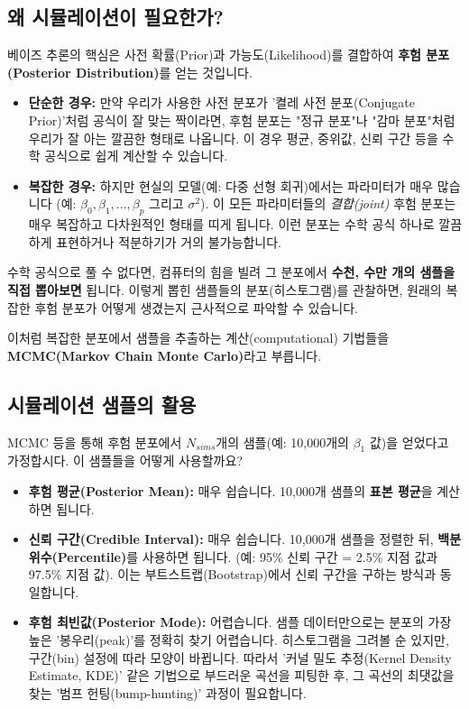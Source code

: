 \documentclass[11pt,a4paper]{book}
\theoremstyle{definition}
\begin{document}
\subsection{왜 시뮬레이션이 필요한가?}

베이즈 추론의 핵심은 사전 확률(Prior)과 가능도(Likelihood)를 결합하여 \textbf{후험 분포(Posterior Distribution)}를 얻는 것입니다.

\begin{itemize}
    \item \textbf{단순한 경우:} 만약 우리가 사용한 사전 분포가 '켤레 사전 분포(Conjugate Prior)'처럼 공식이 잘 맞는 짝이라면, 후험 분포는 "정규 분포"나 "감마 분포"처럼 우리가 잘 아는 깔끔한 형태로 나옵니다. 이 경우 평균, 중위값, 신뢰 구간 등을 수학 공식으로 쉽게 계산할 수 있습니다.
    \item \textbf{복잡한 경우:} 하지만 현실의 모델(예: 다중 선형 회귀)에서는 파라미터가 매우 많습니다 (예: $\beta_0, \beta_1, ..., \beta_p$ 그리고 $\sigma^2$). 이 모든 파라미터들의 \textit{결합(joint)} 후험 분포는 매우 복잡하고 다차원적인 형태를 띠게 됩니다. 이런 분포는 수학 공식 하나로 깔끔하게 표현하거나 적분하기가 거의 불가능합니다.
\end{itemize}

\begin{keyconcept}[title={복잡한 분포를 이해하는 방법: 시뮬레이션}]
수학 공식으로 풀 수 없다면, 컴퓨터의 힘을 빌려 그 분포에서 \textbf{수천, 수만 개의 샘플을 직접 뽑아보면} 됩니다. 이렇게 뽑힌 샘플들의 분포(히스토그램)를 관찰하면, 원래의 복잡한 후험 분포가 어떻게 생겼는지 근사적으로 파악할 수 있습니다.

이처럼 복잡한 분포에서 샘플을 추출하는 계산(computational) 기법들을 \textbf{MCMC(Markov Chain Monte Carlo)}라고 부릅니다.
\end{keyconcept}

\subsection{시뮬레이션 샘플의 활용}
MCMC 등을 통해 후험 분포에서 $N_{sims}$개의 샘플(예: 10,000개의 $\beta_1$ 값)을 얻었다고 가정합시다. 이 샘플들을 어떻게 사용할까요?

\begin{itemize}
    \item \textbf{후험 평균(Posterior Mean):} 매우 쉽습니다. 10,000개 샘플의 \textbf{표본 평균}을 계산하면 됩니다.
    \item \textbf{신뢰 구간(Credible Interval):} 매우 쉽습니다. 10,000개 샘플을 정렬한 뒤, \textbf{백분위수(Percentile)}를 사용하면 됩니다. (예: 95\% 신뢰 구간 = 2.5\% 지점 값과 97.5\% 지점 값). 이는 부트스트랩(Bootstrap)에서 신뢰 구간을 구하는 방식과 동일합니다.
    \item \textbf{후험 최빈값(Posterior Mode):} 어렵습니다. 샘플 데이터만으로는 분포의 가장 높은 '봉우리(peak)'를 정확히 찾기 어렵습니다. 히스토그램을 그려볼 순 있지만, 구간(bin) 설정에 따라 모양이 바뀝니다. 따라서 '커널 밀도 추정(Kernel Density Estimate, KDE)' 같은 기법으로 부드러운 곡선을 피팅한 후, 그 곡선의 최댓값을 찾는 '범프 헌팅(bump-hunting)' 과정이 필요합니다.
\end{itemize}
\end{document}
